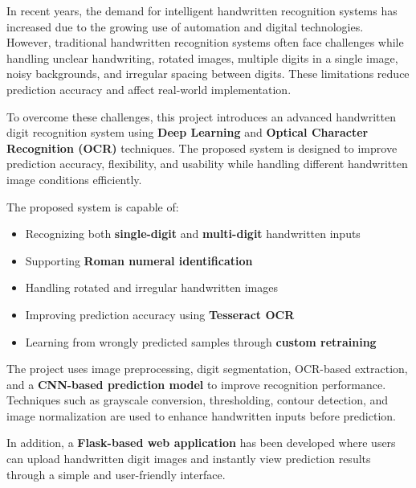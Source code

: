 \documentclass[12pt,a4paper]{article}
\begin{document}
\vspace{0.3cm}

\noindent
In recent years, the demand for intelligent handwritten recognition systems has increased due to the growing use of automation and digital technologies. However, traditional handwritten recognition systems often face challenges while handling unclear handwriting, rotated images, multiple digits in a single image, noisy backgrounds, and irregular spacing between digits. These limitations reduce prediction accuracy and affect real-world implementation.

\vspace{0.3cm}

\noindent
To overcome these challenges, this project introduces an advanced handwritten digit recognition system using \textbf{Deep Learning} and \textbf{Optical Character Recognition (OCR)} techniques. The proposed system is designed to improve prediction accuracy, flexibility, and usability while handling different handwritten image conditions efficiently.

\vspace{0.3cm}

\noindent
The proposed system is capable of:
\begin{itemize}
\item Recognizing both \textbf{single-digit} and \textbf{multi-digit} handwritten inputs
\item Supporting \textbf{Roman numeral identification}
\item Handling rotated and irregular handwritten images
\item Improving prediction accuracy using \textbf{Tesseract OCR}
\item Learning from wrongly predicted samples through \textbf{custom retraining}
\end{itemize}

\vspace{0.3cm}

\noindent
The project uses image preprocessing, digit segmentation, OCR-based extraction, and a \textbf{CNN-based prediction model} to improve recognition performance. Techniques such as grayscale conversion, thresholding, contour detection, and image normalization are used to enhance handwritten inputs before prediction.

\vspace{0.3cm}

\noindent
In addition, a \textbf{Flask-based web application} has been developed where users can upload handwritten digit images and instantly view prediction results through a simple and user-friendly interface.
\end{document}
